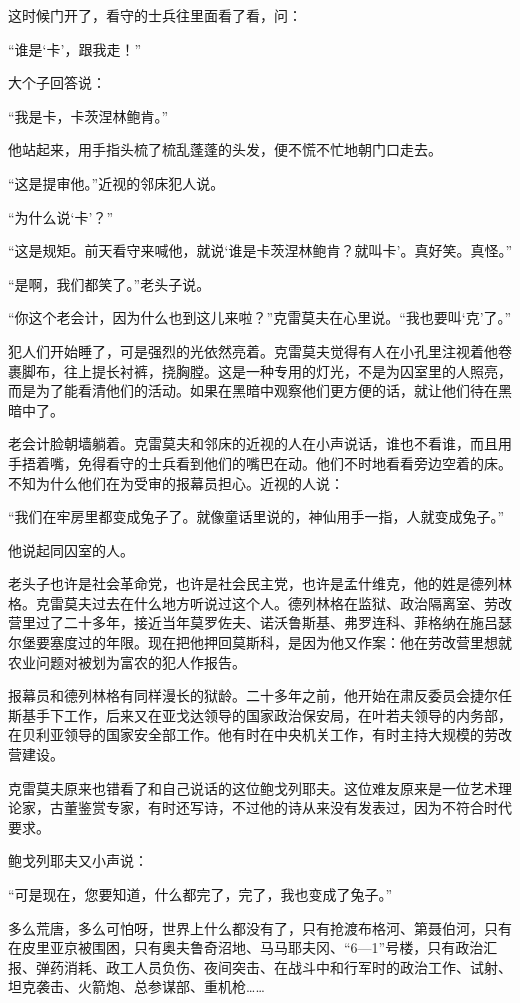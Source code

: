 这时候门开了，看守的士兵往里面看了看，问：

“谁是‘卡’，跟我走！”

大个子回答说：

“我是卡，卡茨涅林鲍肯。”

他站起来，用手指头梳了梳乱蓬蓬的头发，便不慌不忙地朝门口走去。

“这是提审他。”近视的邻床犯人说。

“为什么说‘卡’？”

“这是规矩。前天看守来喊他，就说‘谁是卡茨涅林鲍肯？就叫卡’。真好笑。真怪。”

“是啊，我们都笑了。”老头子说。

“你这个老会计，因为什么也到这儿来啦？”克雷莫夫在心里说。“我也要叫‘克’了。”

犯人们开始睡了，可是强烈的光依然亮着。克雷莫夫觉得有人在小孔里注视着他卷裹脚布，往上提长衬裤，挠胸膛。这是一种专用的灯光，不是为囚室里的人照亮，而是为了能看清他们的活动。如果在黑暗中观察他们更方便的话，就让他们待在黑暗中了。

老会计脸朝墙躺着。克雷莫夫和邻床的近视的人在小声说话，谁也不看谁，而且用手捂着嘴，免得看守的士兵看到他们的嘴巴在动。他们不时地看看旁边空着的床。不知为什么他们在为受审的报幕员担心。近视的人说：

“我们在牢房里都变成兔子了。就像童话里说的，神仙用手一指，人就变成兔子。”

他说起同囚室的人。

老头子也许是社会革命党，也许是社会民主党，也许是孟什维克，他的姓是德列林格。克雷莫夫过去在什么地方听说过这个人。德列林格在监狱、政治隔离室、劳改营里过了二十多年，接近当年莫罗佐夫、诺沃鲁斯基、弗罗连科、菲格纳在施吕瑟尔堡要塞度过的年限。现在把他押回莫斯科，是因为他又作案：他在劳改营里想就农业问题对被划为富农的犯人作报告。

报幕员和德列林格有同样漫长的狱龄。二十多年之前，他开始在肃反委员会捷尔任斯基手下工作，后来又在亚戈达领导的国家政治保安局，在叶若夫领导的内务部，在贝利亚领导的国家安全部工作。他有时在中央机关工作，有时主持大规模的劳改营建设。

克雷莫夫原来也错看了和自己说话的这位鲍戈列耶夫。这位难友原来是一位艺术理论家，古董鉴赏专家，有时还写诗，不过他的诗从来没有发表过，因为不符合时代要求。

鲍戈列耶夫又小声说：

“可是现在，您要知道，什么都完了，完了，我也变成了兔子。”

多么荒唐，多么可怕呀，世界上什么都没有了，只有抢渡布格河、第聂伯河，只有在皮里亚京被围困，只有奥夫鲁奇沼地、马马耶夫冈、“6—1”号楼，只有政治汇报、弹药消耗、政工人员负伤、夜间突击、在战斗中和行军时的政治工作、试射、坦克袭击、火箭炮、总参谋部、重机枪……

